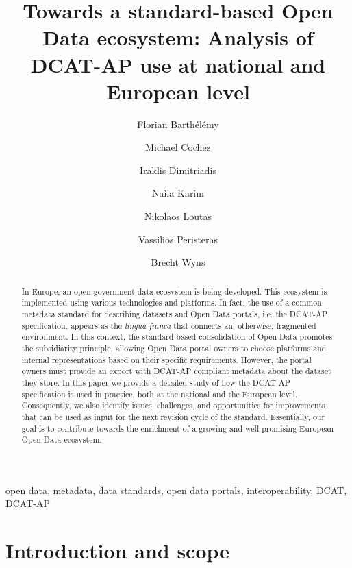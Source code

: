 \documentclass[<options>]{elsarticle}
\begin{document}
\begin{frontmatter}

\title{Towards a standard-based Open Data ecosystem: Analysis of DCAT-AP use at national and European level}

\author[1]{Florian Barth\'el\'emy}
\author[2]{Michael Cochez}
\author[2]{Iraklis Dimitriadis}
\author[2]{Naila Karim}
\author[1]{Nikolaos Loutas}
\author[3]{Vassilios Peristeras}
\author[1]{Brecht Wyns}

\address[1]{PwC Belgium}
\address[2]{Fraunhofer/FIT, Germany}
\address[3]{International Hellenic University, Greece}

\begin{abstract}
In Europe, an open government data ecosystem is being developed. This ecosystem is implemented using various technologies and platforms. In fact, the use of a common metadata standard for describing datasets and Open Data portals, i.e. the DCAT-AP specification, appears as the \textit{lingua franca} that connects an, otherwise, fragmented environment. In this context, the standard-based consolidation of Open Data promotes the subsidiarity principle, allowing Open Data portal owners to choose platforms and internal representations based on their specific requirements. However, the portal owners must provide an export with DCAT-AP compliant metadata about the dataset they store. In this paper we provide a detailed study of how the DCAT-AP specification is used in practice, both at the national and the European level. Consequently, we also identify issues, challenges, and opportunities for improvements that can be used as input for the next revision cycle of the standard. Essentially, our goal is to contribute towards the enrichment of a growing and well-promising European Open Data ecosystem.
\end{abstract}

\begin{keyword}
open data, metadata, data standards, open data portals, interoperability, DCAT, DCAT-AP
\end{keyword}

\end{frontmatter}

\linenumbers

\section{Introduction and scope}
\end{document}
